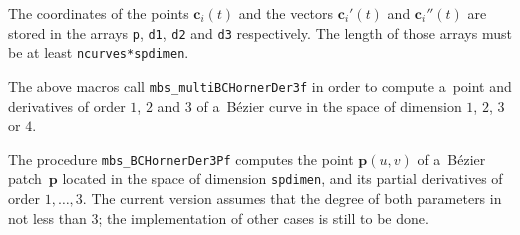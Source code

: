 The coordinates of the points $\bm{c}_i(t)$ and the vectors $\bm{c}_i'(t)$
and $\bm{c}_i''(t)$ are stored in the arrays \texttt{p}, \texttt{d1},
\texttt{d2} and \texttt{d3} respectively.
The length of those arrays must be at least \texttt{ncurves*spdimen}.

\vspace{\bigskipamount}
The above macros call \texttt{mbs\_multiBCHornerDer3f} in order to
compute a~point and derivatives of order $1$, $2$ and $3$ of a~B\'{e}zier
curve in the space of dimension $1$, $2$, $3$ or $4$.

\vspace{\bigskipamount}
The procedure \texttt{mbs\_BCHornerDer3Pf} computes the point $\bm{p}(u,v)$
of a~B\'{e}zier patch~$\bm{p}$ located in the space of dimension
\texttt{spdimen}, and its partial derivatives of order $1,\ldots,3$.
The current version assumes that the degree of both parameters in
not less than $3$; the implementation of other cases is still to be done.

